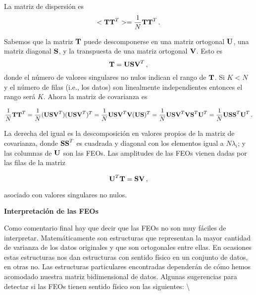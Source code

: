 \documentclass[
]{agujournal2019}
\begin{document}
La matriz de dispersión es
\[<{\textbf T}{\textbf T}^T>=\frac{1}{N} {\textbf T}{\textbf T}^T\,.\]

Sabemos que la matriz \({\textbf T}\) puede descomponerse en una matriz
ortogonal \({\textbf U}\), una matriz diagonal \({\textbf S}\), y la
transpuesta de una matriz ortogonal \({\textbf V}\). Esto es
\[{\textbf T}={\textbf U}{\textbf S}{\textbf V}^T\,,\] donde el número
de valores singulares no nulos indican el rango de \({\textbf T}\). Si
\(K<N\) y el número de filas (i.e., los datos) son linealmente
independientes entonces el rango será \(K\). Ahora la matriz de
covarianza es

\[\frac{1}{N} {\textbf T}{\textbf T}^T = \frac{1}{N} ({\textbf U}{\textbf S}{\textbf V}^T)({\textbf U}{\textbf S}{\textbf V}^T)^T=
\frac{1}{N}{\textbf U}{\textbf S}{\textbf V}^T{\textbf V}({\textbf U}{\textbf S})^T=\frac{1}{N} {\textbf U}{\textbf S}{\textbf V}^T{\textbf V}{\textbf S}^T{\textbf U}^T=\frac{1}{N} {\textbf U}{\textbf S}{\textbf S}^T{\textbf U}^T\,.\]

La derecha del igual es la descomposición en valores propios de la
matriz de covarianza, donde \({\textbf S}{\textbf S}^T\) es cuadrada y
diagonal con los elementos igual a \(N\lambda_i\); y las columnas de
\({\textbf U}\) son las FEOs. Las amplitudes de las FEOs vienen dadas
por las filas de la matriz

\[
{\textbf U}^T{\textbf T}={\textbf S}{\textbf V}\,,\]

asociado con valores singulares no nulos.

\vspace{0.25cm}

\textbf{Interpretación de las FEOs}

Como comentario final hay que decir que las FEOs no son muy fáciles de
interpretar. Matemáticamente son estructuras que representan la mayor
cantidad de varianza de los datos originales y que son ortogonales entre
ellas. En ocasiones estas estructuras nos dan estructuras con sentido
físico en un conjunto de datos, en otras no. Las estructuras
particulares encontradas dependerán de cómo hemos acomodado nuestra
matriz bidimensional de datos. Algunas sugerencias para detectar si las
FEOs tienen sentido físico son las siguientes: \textbackslash{}
\end{document}
